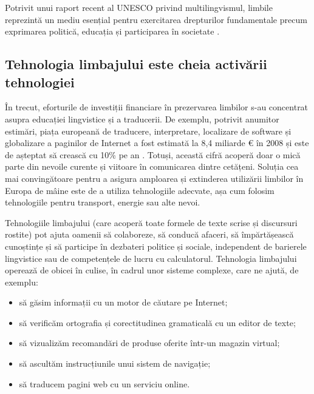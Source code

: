 \begin{multicols}{2}

Potrivit unui raport recent al UNESCO privind multilingvismul, limbile reprezintă un mediu esențial pentru exercitarea drepturilor fundamentale precum exprimarea politică, educația și participarea în societate \cite{Unesco1}.

\subsection{Tehnologia limbajului este cheia activării tehnologiei}

În trecut, eforturile de investiții financiare în prezervarea limbilor s-au concentrat asupra educației lingvistice și a traducerii. De exemplu, potrivit anumitor estimări, piața europeană de traducere, interpretare, localizare de software și globalizare a paginilor de Internet a fost estimată la 8,4 miliarde € în 2008 și este de așteptat să crească cu 10\% pe an \cite{EC3}. Totuși, această cifră acoperă doar o mică parte din nevoile curente și viitoare în comunicarea dintre cetățeni. Soluția cea mai convingătoare pentru a asigura amploarea și extinderea utilizării limbilor în Europa de mâine este de a utiliza tehnologiile adecvate, așa cum folosim tehnologiile pentru transport, energie sau alte nevoi.

Tehnologiile limbajului (care acoperă toate formele de texte scrise și discursuri rostite) pot ajuta oamenii să colaboreze, să conducă afaceri, să împărtășească cunoștințe și să participe în dezbateri politice și sociale, independent de barierele lingvistice sau de competențele de lucru cu calculatorul. Tehnologia limbajului operează de obicei în culise, în cadrul unor sisteme complexe, care ne ajută, de exemplu:

\begin{itemize}
\item să găsim informații cu un motor de căutare pe Internet;
\item să verificăm ortografia și corectitudinea gramaticală cu un editor de texte;
\item să vizualizăm recomandări de produse oferite \mbox{într-un} magazin virtual;
\item să ascultăm instrucțiunile unui sistem de navigație;
\item să traducem pagini web cu un serviciu online.
\end{itemize}


\end{multicols}
